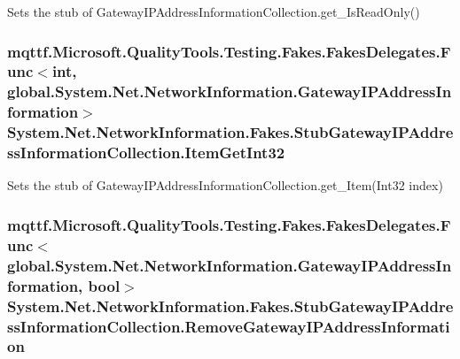 Sets the stub of Gateway\-I\-P\-Address\-Information\-Collection.\-get\-\_\-\-Is\-Read\-Only()

\hypertarget{class_system_1_1_net_1_1_network_information_1_1_fakes_1_1_stub_gateway_i_p_address_information_collection_ac25b03aaab199bc9325baf45a7bf9a79}{
\subsubsection[{Item\-Get\-Int32}]{\setlength{\rightskip}{0pt plus 5cm}mqttf.\-Microsoft.\-Quality\-Tools.\-Testing.\-Fakes.\-Fakes\-Delegates.\-Func$<$int, global.\-System.\-Net.\-Network\-Information.\-Gateway\-I\-P\-Address\-Information$>$ System.\-Net.\-Network\-Information.\-Fakes.\-Stub\-Gateway\-I\-P\-Address\-Information\-Collection.\-Item\-Get\-Int32}}\label{class_system_1_1_net_1_1_network_information_1_1_fakes_1_1_stub_gateway_i_p_address_information_collection_ac25b03aaab199bc9325baf45a7bf9a79}


Sets the stub of Gateway\-I\-P\-Address\-Information\-Collection.\-get\-\_\-\-Item(\-Int32 index)

\hypertarget{class_system_1_1_net_1_1_network_information_1_1_fakes_1_1_stub_gateway_i_p_address_information_collection_a681eed1695ab221e391de31adb51d281}{
\subsubsection[{Remove\-Gateway\-I\-P\-Address\-Information}]{\setlength{\rightskip}{0pt plus 5cm}mqttf.\-Microsoft.\-Quality\-Tools.\-Testing.\-Fakes.\-Fakes\-Delegates.\-Func$<$global.\-System.\-Net.\-Network\-Information.\-Gateway\-I\-P\-Address\-Information, bool$>$ System.\-Net.\-Network\-Information.\-Fakes.\-Stub\-Gateway\-I\-P\-Address\-Information\-Collection.\-Remove\-Gateway\-I\-P\-Address\-Information}}\label{class_system_1_1_net_1_1_network_information_1_1_fakes_1_1_stub_gateway_i_p_address_information_collection_a681eed1695ab221e391de31adb51d281}


